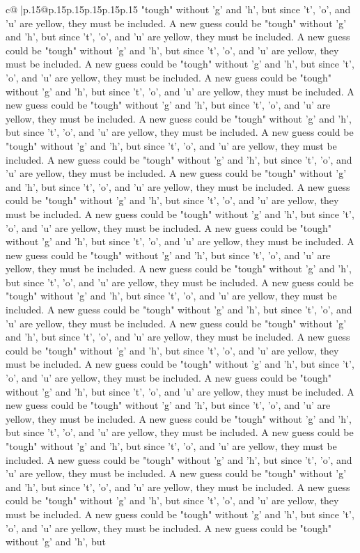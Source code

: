 \documentclass{article}
\begin{document}
{\begin{supertabular}{c@{$\;$}|p{.15\linewidth}@{}p{.15\linewidth}p{.15\linewidth}p{.15\linewidth}p{.15\linewidth}p{.15\linewidth}}
{{{"tough" without 'g' and 'h', but since 't', 'o', and 'u' are yellow, they must be included. A new guess could be "tough" without 'g' and 'h', but since 't', 'o', and 'u' are yellow, they must be included. A new guess could be "tough" without 'g' and 'h', but since 't', 'o', and 'u' are yellow, they must be included. A new guess could be "tough" without 'g' and 'h', but since 't', 'o', and 'u' are yellow, they must be included. A new guess could be "tough" without 'g' and 'h', but since 't', 'o', and 'u' are yellow, they must be included. A new guess could be "tough" without 'g' and 'h', but since 't', 'o', and 'u' are yellow, they must be included. A new guess could be "tough" without 'g' and 'h', but since 't', 'o', and 'u' are yellow, they must be included. A new guess could be "tough" without 'g' and 'h', but since 't', 'o', and 'u' are yellow, they must be included. A new guess could be "tough" without 'g' and 'h', but since 't', 'o', and 'u' are yellow, they must be included. A new guess could be "tough" without 'g' and 'h', but since 't', 'o', and 'u' are yellow, they must be included. A new guess could be "tough" without 'g' and 'h', but since 't', 'o', and 'u' are yellow, they must be included. A new guess could be "tough" without 'g' and 'h', but since 't', 'o', and 'u' are yellow, they must be included. A new guess could be "tough" without 'g' and 'h', but since 't', 'o', and 'u' are yellow, they must be included. A new guess could be "tough" without 'g' and 'h', but since 't', 'o', and 'u' are yellow, they must be included. A new guess could be "tough" without 'g' and 'h', but since 't', 'o', and 'u' are yellow, they must be included. A new guess could be "tough" without 'g' and 'h', but since 't', 'o', and 'u' are yellow, they must be included. A new guess could be "tough" without 'g' and 'h', but since 't', 'o', and 'u' are yellow, they must be included. A new guess could be "tough" without 'g' and 'h', but since 't', 'o', and 'u' are yellow, they must be included. A new guess could be "tough" without 'g' and 'h', but since 't', 'o', and 'u' are yellow, they must be included. A new guess could be "tough" without 'g' and 'h', but since 't', 'o', and 'u' are yellow, they must be included. A new guess could be "tough" without 'g' and 'h', but since 't', 'o', and 'u' are yellow, they must be included. A new guess could be "tough" without 'g' and 'h', but since 't', 'o', and 'u' are yellow, they must be included. A new guess could be "tough" without 'g' and 'h', but since 't', 'o', and 'u' are yellow, they must be included. A new guess could be "tough" without 'g' and 'h', but since 't', 'o', and 'u' are yellow, they must be included. A new guess could be "tough" without 'g' and 'h', but since 't', 'o', and 'u' are yellow, they must be included. A new guess could be "tough" without 'g' and 'h', but since 't', 'o', and 'u' are yellow, they must be included. A new guess could be "tough" without 'g' and 'h', but since 't', 'o', and 'u' are yellow, they must be included. A new guess could be "tough" without 'g' and 'h', but since 't', 'o', and 'u' are yellow, they must be included. A new guess could be "tough" without 'g' and 'h', but }}}
\end{supertabular}}
\end{document}
